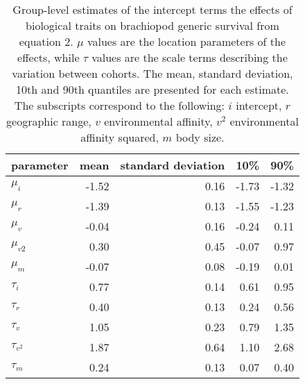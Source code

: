 \documentclass{article}
\begin{document}
\begin{table}
  \centering
  \begin{tabular}{ l r r r r }
    \hline
    parameter & mean & standard deviation & 10\% & 90\% \\ 
    \hline
    \(\mu_{i}\) & -1.52 & 0.16 & -1.73 & -1.32 \\ 
    \(\mu_{r}\) & -1.39 & 0.13 & -1.55 & -1.23 \\ 
    \(\mu_{v}\) & -0.04 & 0.16 & -0.24 & 0.11 \\ 
    \(\mu_{v2}\) & 0.30 & 0.45 & -0.07 & 0.97 \\ 
    \(\mu_{m}\) & -0.07 & 0.08 & -0.19 & 0.01 \\ 
    \(\tau_{i}\) & 0.77 & 0.14 & 0.61 & 0.95 \\ 
    \(\tau_{r}\) & 0.40 & 0.13 & 0.24 & 0.56 \\ 
    \(\tau_{v}\) & 1.05 & 0.23 & 0.79 & 1.35 \\ 
    \(\tau_{v^{2}}\) & 1.87 & 0.64 & 1.10 & 2.68 \\ 
    \(\tau_{m}\) & 0.24 & 0.13 & 0.07 & 0.40 \\ 
    \hline
  \end{tabular}
  \caption{Group-level estimates of the intercept terms the effects of biological traits on brachiopod generic survival from equation 2. \(\mu\) values are the location parameters of the effects, while \(\tau\) values are the scale terms describing the variation between cohorts. The mean, standard deviation, 10th and 90th quantiles are presented for each estimate. The subscripts correspond to the following: \(i\) intercept, \(r\) geographic range, \(v\) environmental affinity, \(v^{2}\) environmental affinity squared, \(m\) body size.}
  \label{tab:param}
\end{table}
\end{document}
